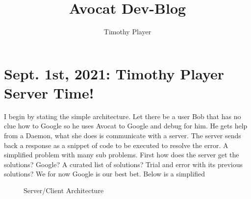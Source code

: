 \documentclass{article}
\title{Avocat Dev-Blog}
\author{Timothy Player}
\begin{document}
\maketitle

\section{Sept. 1st, 2021: Timothy Player Server Time!}

I begin by stating the simple architecture. Let there be a user Bob that has no clue how to Google so he uses Avocat to Google and debug for him.
He gets help from a Daemon, what she does is communicate with a server. The server sends back a response as a snippet of 
code to be executed to resolve the error. A simplified problem with many sub problems. First how does the server get the solutions? Google? A curated list of 
solutions? Trial and error with its previous solutions? We for now Google is our best bet. Below is a simplified 

\begin{figure}
    \caption{Server/Client Architecture}
\end{figure}
\end{document}
